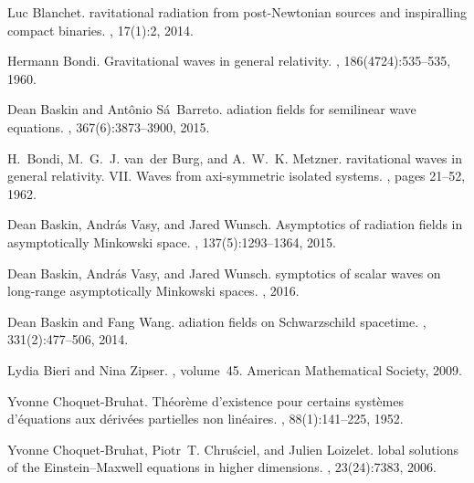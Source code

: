 \documentclass[reqno,11pt,letterpaper]{amsart}
\numberwithin{equation}{section}
\numberwithin{figure}{section}
\theoremstyle{definition}
\theoremstyle{remark}
\begin{document}
\begin{thebibliography}{GCHMG05}
Luc Blanchet.
ravitational radiation from post-{N}ewtonian sources and
  inspiralling compact binaries.
, 17(1):2, 2014.

Hermann Bondi.
\newblock Gravitational waves in general relativity.
, 186(4724):535--535, 1960.

Dean Baskin and Ant{\^o}nio S{\'a}~Barreto.
adiation fields for semilinear wave equations.
,
  367(6):3873--3900, 2015.

H.~Bondi, M.~G.~J. van~der Burg, and A.~W.~K. Metzner.
ravitational waves in general relativity. {V}{I}{I}. {W}aves from
  axi-symmetric isolated systems.
, pages 21--52, 1962.

Dean Baskin, Andr{\'a}s Vasy, and Jared Wunsch.
\newblock Asymptotics of radiation fields in asymptotically {M}inkowski space.
, 137(5):1293--1364, 2015.

Dean Baskin, Andr{\'a}s Vasy, and Jared Wunsch.
symptotics of scalar waves on long-range asymptotically
  {M}inkowski spaces.
, 2016.

Dean Baskin and Fang Wang.
adiation fields on {S}chwarzschild spacetime.
, 331(2):477--506, 2014.

Lydia Bieri and Nina Zipser.
, volume~45.
\newblock American Mathematical Society, 2009.

Yvonne Choquet-Bruhat.
\newblock Th{\'e}or{\`e}me d'existence pour certains syst{\`e}mes
  d'{\'e}quations aux d{\'e}riv{\'e}es partielles non lin{\'e}aires.
, 88(1):141--225, 1952.

Yvonne Choquet-Bruhat, Piotr~T. Chru{\'s}ciel, and Julien Loizelet.
lobal solutions of the {E}instein--{M}axwell equations in higher
  dimensions.
, 23(24):7383, 2006.


\end{thebibliography}
\end{document}
